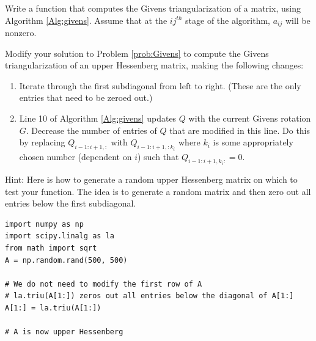 \begin{problem}
\label{prob:Givens}
Write a function that computes the Givens triangularization of a matrix, using Algorithm \ref{Alg:givens}. 
Assume that at the $ij^{th}$ stage of the algorithm, $a_{ij}$ will be nonzero.
\end{problem}


\begin{problem}
\label{prob:givens_hessenberg}
Modify your solution to Problem \ref{prob:Givens} to compute the Givens triangularization of an upper Hessenberg matrix, making the following changes:
\begin{enumerate}
\item Iterate through the first subdiagonal from left to right. (These are the only entries that need to be zeroed out.)
\item Line 10 of Algorithm \ref{Alg:givens} updates $Q$ with the current Givens rotation $G$. Decrease the number of entries of $Q$ that are modified in this line. Do this by replacing $Q_{i-1:i+1, :}$ with $Q_{i-1:i+1, :k_i}$ where $k_i$ is some appropriately chosen number (dependent on $i$) such that $Q_{i-1:i+1, k_i:}=0$.
\end{enumerate}
Hint: Here is how to generate a random upper Hessenberg matrix on which to test your function.
The idea is to generate a random matrix and then zero out all entries below the first subdiagonal.
\begin{lstlisting}
import numpy as np
import scipy.linalg as la
from math import sqrt
A = np.random.rand(500, 500)

# We do not need to modify the first row of A
# la.triu(A[1:]) zeros out all entries below the diagonal of A[1:]
A[1:] = la.triu(A[1:])

# A is now upper Hessenberg
\end{lstlisting}

\end{problem}


